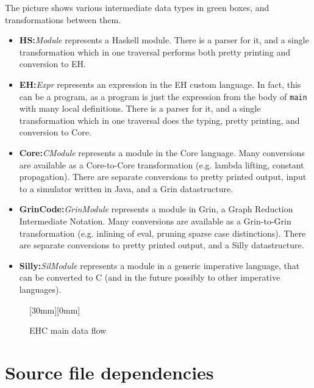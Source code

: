 The picture shows various intermediate data types in green boxes,
and transformations between them.
\begin{itemize}
\item {\bf HS:}{\em Module}
represents a Haskell module.
There is a parser for it, and a single transformation 
which in one traversal performs both pretty printing and
conversion to EH.

\item {\bf EH:}{\em Expr}
represents an expression in the EH custom language.
In fact, this can be a program, as a program is just the expression
from the body of \verb"main" with many local definitions.
There is a parser for it, and a single transformation
which in one traversal does the typing, pretty printing, 
and conversion to Core.

\item {\bf Core:}{\em CModule}
represents a module in the Core language.
Many conversions are available as a Core-to-Core transformation
(e.g. lambda lifting, constant propagation).
There are separate conversions to pretty printed output, 
input to a simulator written in Java,
and a Grin datastructure.

\item {\bf GrinCode:}{\em GrinModule}
represents a module in Grin, a Graph Reduction Intermediate Notation.
Many conversions are available as a Grin-to-Grin transformation
(e.g. inlining of eval, pruning sparse case distinctions).
There are separate conversions to pretty printed output, 
and a Silly datastructure.


\item {\bf Silly:}{\em SilModule}
represents a module in a generic imperative language,
that can be converted to C 
(and in the future possibly to other imperative languages).

\end{itemize}






\begin{figure}[bp]
\raisebox{-30mm}[30mm][0mm]{}
\caption{EHC main data flow}
\label{fig.dataflow}
\end{figure}



\clearpage

\section{Source file dependencies}\label{sec.source}

